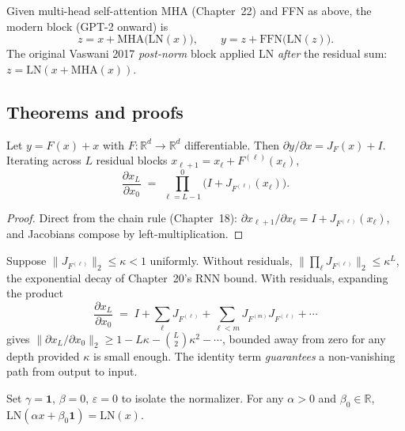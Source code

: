 \begin{definition}
Given multi-head self-attention $\mathrm{MHA}$ (Chapter~22) and FFN as above, the modern block (GPT-2 onward) is
\[
  z = x + \mathrm{MHA}\bigl(\mathrm{LN}(x)\bigr),
  \qquad
  y = z + \mathrm{FFN}\bigl(\mathrm{LN}(z)\bigr).
\]
The original Vaswani 2017 \emph{post-norm} block applied LN \emph{after} the residual sum: $z = \mathrm{LN}(x + \mathrm{MHA}(x))$.
\end{definition}

\subsection*{Theorems and proofs}

\begin{theorem}
\label{thm:res}
Let $y = F(x) + x$ with $F : \mathbb{R}^d \to \mathbb{R}^d$ differentiable. Then $\partial y / \partial x = J_F(x) + I$. Iterating across $L$ residual blocks $x_{\ell+1} = x_\ell + F^{(\ell)}(x_\ell)$,
\[
  \frac{\partial x_L}{\partial x_0} \;=\; \prod_{\ell = L-1}^{0} \bigl(I + J_{F^{(\ell)}}(x_\ell)\bigr).
\]
\end{theorem}

\begin{proof}
Direct from the chain rule (Chapter~18): $\partial x_{\ell+1}/\partial x_\ell = I + J_{F^{(\ell)}}(x_\ell)$, and Jacobians compose by left-multiplication.
\end{proof}

\begin{corollary}
Suppose $\|J_{F^{(\ell)}}\|_2 \le \kappa < 1$ uniformly. Without residuals, $\|\prod_\ell J_{F^{(\ell)}}\|_2 \le \kappa^L$, the exponential decay of Chapter~20's RNN bound. With residuals, expanding the product
\[
  \frac{\partial x_L}{\partial x_0} \;=\; I + \sum_\ell J_{F^{(\ell)}} + \sum_{\ell < m} J_{F^{(m)}} J_{F^{(\ell)}} + \cdots
\]
gives $\|\partial x_L/\partial x_0\|_2 \ge 1 - L\kappa - \binom{L}{2}\kappa^2 - \cdots$, bounded away from zero for any depth provided $\kappa$ is small enough. The identity term \emph{guarantees} a non-vanishing path from output to input.
\end{corollary}

\begin{theorem}
\label{thm:ln}
Set $\gamma = \mathbf 1$, $\beta = 0$, $\varepsilon = 0$ to isolate the normalizer. For any $\alpha > 0$ and $\beta_0 \in \mathbb{R}$, $\mathrm{LN}(\alpha x + \beta_0 \mathbf{1}) = \mathrm{LN}(x)$.
\end{theorem}

